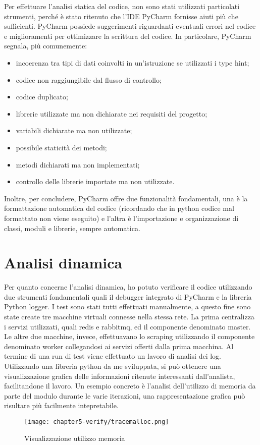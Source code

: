 Per effettuare l’analisi statica del codice, non sono stati utilizzati particolati strumenti, perché è stato ritenuto che l’IDE PyCharm fornisse aiuti più che sufficienti. PyCharm possiede suggerimenti riguardanti eventuali errori nel codice e miglioramenti per ottimizzare la scrittura del codice.
In particolare, PyCharm segnala, più comunemente:
\begin{itemize}
	\item incoerenza tra tipi di dati coinvolti in un’istruzione se utilizzati i type hint;
	\item codice non raggiungibile dal flusso di controllo;
	\item codice duplicato;
	\item librerie utilizzate ma non dichiarate nei requisiti del progetto;
	\item variabili dichiarate ma non utilizzate;
	\item possibile staticità dei metodi;
	\item metodi dichiarati ma non implementati;
	\item controllo delle librerie importate ma non utilizzate.
\end{itemize}
\noindent
Inoltre, per concludere, PyCharm offre due funzionalità fondamentali, una è la formattazione automatica del codice (ricordando che in python codice mal formattato non viene eseguito) e l’altra è l’importazione e organizzazione di classi, moduli e librerie, sempre automatica.

\section{Analisi dinamica}

Per quanto concerne l’analisi dinamica, ho potuto verificare il codice utilizzando due strumenti fondamentali quali il debugger integrato di PyCharm e la libreria Python logger. I test sono stati tutti effettuati manualmente, a questo fine sono state create tre macchine virtuali connesse nella stessa rete. La prima centralizza i servizi utilizzati, quali redis e rabbitmq, ed il componente denominato master. Le altre due macchine, invece, effettuavano lo scraping utilizzando il componente denominato worker collegandosi ai servizi offerti dalla prima macchina. \newline{}
Al termine di una run di test viene effettuato un lavoro di analisi dei log. Utilizzando una libreria python da me sviluppata, si può ottenere una visualizzazione grafica delle informazioni ritenute interessanti dall'analista, facilitandone il lavoro. Un esempio concreto è l'analisi dell'utilizzo di memoria da parte del modulo durante le varie iterazioni, una rappresentazione grafica può risultare più facilmente intepretabile.

\begin{figure}[!h] 
    \centering 
    \texttt{[image: chapter5-verify/tracemalloc.png]} 
    \caption{Visualizzazione utilizzo memoria}
    \label{fig:visualizzazione-utilizzo-memoria} 
\end{figure}




